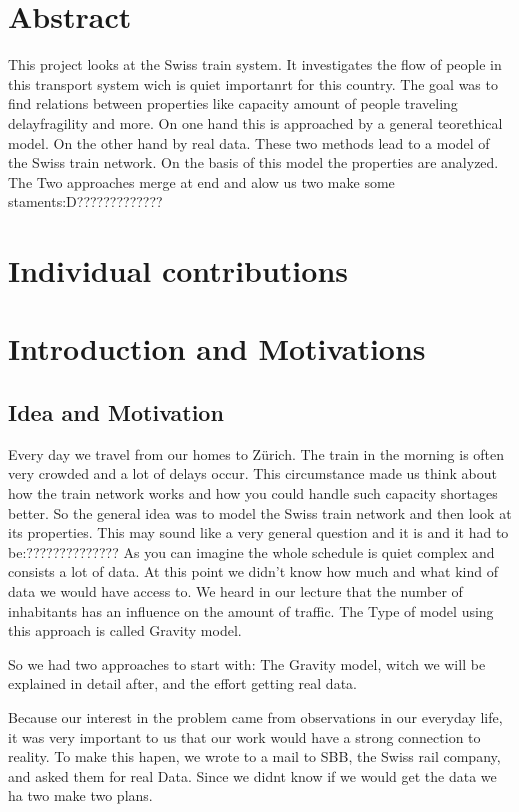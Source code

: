 \documentclass[11pt]{article}
\begin{document}
\section{Abstract}

This project looks at the Swiss train system. It investigates the flow of people in this transport system wich is quiet importanrt for this country. The goal was to find relations between properties like capacity amount of people traveling delayfragility and more. On one hand this is approached  by a general teorethical model. On the other hand by real data. These two methods lead to a model of the Swiss train  network. On the basis of this model the properties are analyzed. The Two approaches merge at end and alow us two make some staments:D?????????????
 

\section{Individual contributions}

\url{}

\section{Introduction and Motivations}

\subsection{Idea and Motivation}


Every day we travel from our homes to Zürich. The train in the morning is often very crowded and a lot of delays occur. This circumstance made us think about how the train network works and how you could handle such capacity shortages better. 
So the general idea was to model the Swiss train network and then look at its properties. This may sound like a very general question and it is and it had to be:?????????????? As you can imagine the whole schedule is quiet complex and consists a lot of data. At this point we didn't know how much and what kind of data we would have access to. We heard in our lecture that the number of inhabitants has an influence on the amount of traffic. The Type of model using this approach is called Gravity model.

So we had two approaches to start with: The Gravity model, witch we will be explained in detail after, and the effort getting real data.

Because our interest in the problem came from observations in our everyday life, it was very important to us that our work would have a strong connection to reality. To make this hapen, we wrote to a mail to SBB, the Swiss rail company, and asked them for real Data. Since we didnt know if we would get the data we ha two make two plans.
\end{document}
